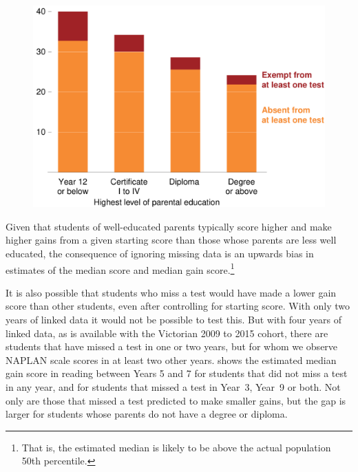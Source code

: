 \begin{figure}[t]
 \includegraphics[width=\columnwidth]{atlas/Missing_SES.pdf}\label{fig:missing}

\end{figure}

Given that students of well-educated parents typically score higher and make higher gains from a given starting score than those whose parents are less well educated, the consequence of ignoring missing data is an upwards bias in estimates of the median score and median gain score.\footnote{That is, the estimated median is likely to be above the actual population 50th percentile.}

It is also possible that students who miss a test would have made a lower gain score than other students, even after controlling for starting score. With only two years of linked data it would not be possible to test this. But with four years of linked data, as is available with the Victorian 2009 to 2015 cohort, there are students that have missed a test in one or two years, but for whom we observe NAPLAN scale scores in at least two other years.  shows the estimated median gain score in reading between Years 5 and 7 for students that did not miss a test in any year, and for students that missed a test in \mbox{Year 3}, \mbox{Year 9} or both. Not only are those that missed a test predicted to make smaller gains, but the gap is larger for students whose parents do not have a degree or diploma.

